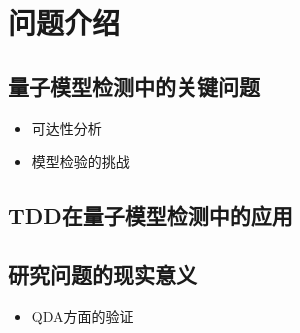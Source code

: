 \chapter{问题介绍}

\section{量子模型检测中的关键问题}
\begin{itemize}
  \item 可达性分析
  \item 模型检验的挑战
\end{itemize}

\section{TDD在量子模型检测中的应用}

\section{研究问题的现实意义}
\begin{itemize}
  \item QDA方面的验证
\end{itemize}

